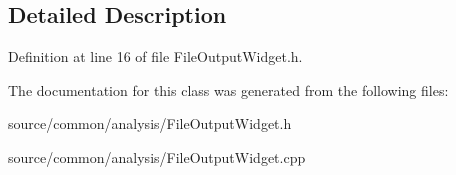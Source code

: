 \subsection{Detailed Description}


Definition at line 16 of file File\-Output\-Widget.\-h.



The documentation for this class was generated from the following files\-:\begin{DoxyCompactItemize}
\item 
source/common/analysis/File\-Output\-Widget.\-h\item 
source/common/analysis/File\-Output\-Widget.\-cpp\end{DoxyCompactItemize}
